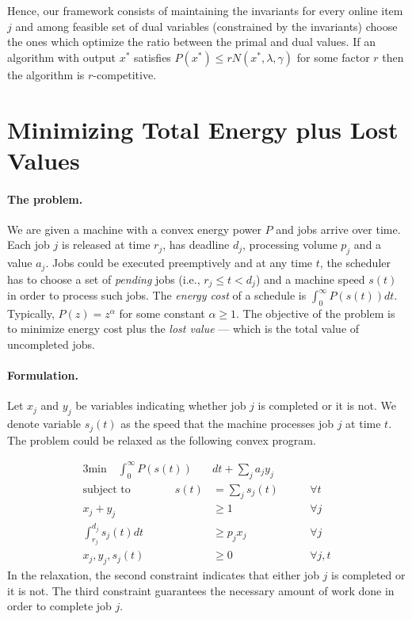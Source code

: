 \documentclass[11pt]{article}
\begin{document}
Hence, our framework consists of maintaining the invariants for every online item $j$ and
among feasible set of dual variables (constrained by the invariants) choose the ones 
which optimize the ratio between the primal and dual values. If an algorithm with output 
$x^{*}$ satisfies $P(x^{*}) \leq r N(x^{*},\lambda,\gamma)$ for some factor $r$ then 
the algorithm is $r$-competitive.

\section{Minimizing Total Energy plus Lost Values}	\label{sec:energy+values}

\paragraph{The problem.}
We are given a machine with a convex energy power $P$ and
jobs arrive over time. Each job $j$ is released at time $r_{j}$, has deadline $d_{j}$, processing volume 
$p_{j}$ and a value $a_{j}$. Jobs could be executed preemptively and at any time $t$, the scheduler 
has to choose a set of \emph{pending} jobs (i.e., $r_{j} \leq t < d_{j}$) and a machine speed $s(t)$ 
in order to process such jobs. The \emph{energy cost} of a schedule is 
$\int_{0}^{\infty} P(s(t))dt$. Typically,
$P(z) = z^{\alpha}$ for some constant $\alpha \geq 1$. The objective of the problem
is to minimize energy cost plus the \emph{lost value} --- which is the total value of uncompleted jobs.


\paragraph{Formulation.} Let $x_{j}$ and $y_{j}$ be variables indicating whether job $j$ is completed or it is not.
We denote variable $s_{j}(t)$ as the speed that the machine processes job $j$ at time $t$.  
The problem could be relaxed as the following convex program.
 
  \begin{alignat*}{3}
    \text{min} \quad \int_{0}^{\infty} P(s(t)) & dt + \sum_{j} a_{j} y_{j}  \\ 
\text{subject to} \qquad \qquad s(t) &= \sum_{j} s_{j}(t)	\qquad &\forall t \\
						 x_{j} + y_{j} &\geq 1 \qquad &\forall j \\
					         \int_{r_{j}}^{d_{j}} s_{j}(t)dt & \geq  p_{j}x_{j}   \qquad &\forall j\\
					         x_{j}, y_{j}, s_{j}(t) &\geq 0 \qquad &\forall j, t
  \end{alignat*}
In the relaxation, the second constraint indicates that either job $j$ is completed or it is not. 
The third constraint guarantees the necessary amount of work done in order to complete job $j$.  
\end{document}

